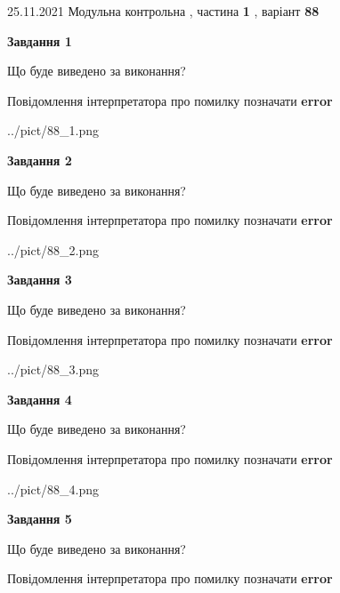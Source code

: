 \documentclass[10pt, ukrainian]{article}
\begin{document}
{25.11.2021 Модульна контрольна , частина \textbf { 1 }, варіант  \No \textbf { 88 }\par}
{
\begin {large}

{\begin {center}\textbf{Завдання 1}\end {center}}\par
Що буде виведено за виконання? \par
Повідомлення інтерпретатора про помилку позначати \textbf{error}

\begin{center}
	{../pict/88_1.png}
\end{center}
\newpage

{\begin {center}\textbf{Завдання 2}\end {center}}\par
Що буде виведено за виконання? \par
Повідомлення інтерпретатора про помилку позначати \textbf{error}

\begin{center}
	{../pict/88_2.png}
\end{center}
\newpage

{\begin {center}\textbf{Завдання 3}\end {center}}\par
Що буде виведено за виконання? \par
Повідомлення інтерпретатора про помилку позначати \textbf{error}

\begin{center}
	{../pict/88_3.png}
\end{center}
\newpage

{\begin {center}\textbf{Завдання 4}\end {center}}\par
Що буде виведено за виконання? \par
Повідомлення інтерпретатора про помилку позначати \textbf{error}

\begin{center}
	{../pict/88_4.png}
\end{center}
\newpage

{\begin {center}\textbf{Завдання 5}\end {center}}\par
Що буде виведено за виконання? \par
Повідомлення інтерпретатора про помилку позначати \textbf{error}


\end{large}}
\end{document}
